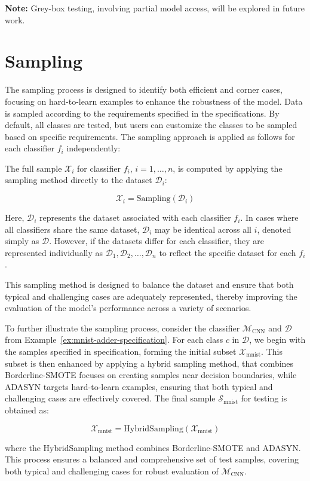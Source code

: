 \textbf{Note:} Grey-box testing, involving partial model access, will be explored in future work.
\section{Sampling}
The sampling process is designed to identify both efficient and corner cases, focusing on hard-to-learn examples to enhance the robustness of the model. Data is sampled according to the requirements specified in the specifications. By default, all classes are tested, but users can customize the classes to be sampled based on specific requirements. The sampling approach is applied as follows for each classifier $f_i$ independently:

The full sample $\mathcal{X}_i$ for classifier $f_i$, $i=1,\dots,n$, is computed by applying the sampling method directly to the dataset $\mathcal{D}_i$:

\begin{equation}
\mathcal{X}_i = \text{Sampling}(\mathcal{D}_i)
\end{equation}

Here, $\mathcal{D}_i$ represents the dataset associated with each classifier $f_i$. In cases where all classifiers share the same dataset, $\mathcal{D}_i$ may be identical across all $i$, denoted simply as $\mathcal{D}$. However, if the datasets differ for each classifier, they are represented individually as $\mathcal{D}_1, \mathcal{D}_2, \dots, \mathcal{D}_n$ to reflect the specific dataset for each $f_i$.



This sampling method is designed to balance the dataset and ensure that both typical and challenging cases are adequately represented, thereby improving the evaluation of the model's performance across a variety of scenarios.


\begin{example}
  \label{ex:sampling}
  To further illustrate the sampling process, consider the classifier $\mathcal{M}_{\text{CNN}}$ and $\mathcal{D}$ from Example~\ref{ex:mnist-adder-specification}. For each class $c$ in $\mathcal{D}$, we begin with the samples specified in specification, forming the initial subset $\mathcal{X}_{\text{mnist}}$. This subset is then enhanced by applying a hybrid sampling method, that combines Borderline-SMOTE focuses on creating samples near decision boundaries, while ADASYN targets hard-to-learn examples, ensuring that both typical and challenging cases are effectively covered. The final sample $\mathcal{S}_{\text{mnist}}$ for testing is obtained as:
  

  \begin{equation}
    \mathcal{X}_{\text{mnist}} = \text{HybridSampling}(\mathcal{X}_{\text{mnist}})
  \end{equation}

  where the HybridSampling method combines Borderline-SMOTE and ADASYN. This process ensures a balanced and comprehensive set of test samples, covering both typical and challenging cases for robust evaluation of $\mathcal{M}_{\text{CNN}}$.
\end{example}




